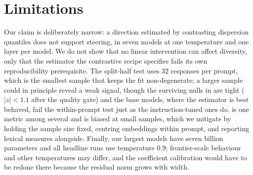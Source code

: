 \section{Limitations}

Our claim is deliberately narrow: a direction estimated by contrasting dispersion quantiles does not
support steering, in seven models at one temperature and one layer per model. We do not show that no
linear intervention can affect diversity, only that the estimator the contrastive recipe specifies
fails its own reproducibility prerequisite. The split-half test uses $32$ responses per prompt,
which is the smallest sample that keeps the fit non-degenerate; a larger sample could in principle
reveal a weak signal, though the surviving nulls in  are tight
($|z| < 1.1$ after the quality gate) and the base models, where the estimator is best behaved, fail
the within-prompt test just as the instruction-tuned ones do. \vendi{} is one metric among several
and is biased at small samples, which we mitigate by holding the sample size fixed, centring
embeddings within prompt, and reporting lexical measures alongside. Finally, our largest models have
seven billion parameters and all headline runs use temperature $0.9$; frontier-scale behaviour and
other temperatures may differ, and the coefficient calibration would have to be redone there because
the residual norm grows with width.
